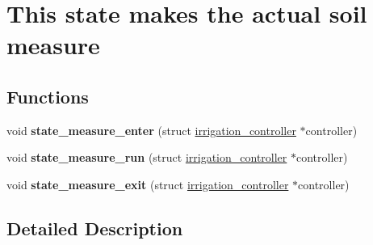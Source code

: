 \hypertarget{group__state__measure}{}\section{This state makes the actual soil measure}
\label{group__state__measure}
\subsection*{Functions}
\begin{DoxyCompactItemize}
\item 
\hypertarget{group__state__measure_ga24a42892ba25be220bff68fc151e0be7}{}void {\bfseries state\+\_\+measure\+\_\+enter} (struct \hyperlink{structirrigation__controller}{irrigation\+\_\+controller} $\ast$controller)\label{group__state__measure_ga24a42892ba25be220bff68fc151e0be7}

\item 
\hypertarget{group__state__measure_ga410776694bde81bde92a0b6b178ac015}{}void {\bfseries state\+\_\+measure\+\_\+run} (struct \hyperlink{structirrigation__controller}{irrigation\+\_\+controller} $\ast$controller)\label{group__state__measure_ga410776694bde81bde92a0b6b178ac015}

\item 
\hypertarget{group__state__measure_ga0f85f8645f5311e776e85a3697517266}{}void {\bfseries state\+\_\+measure\+\_\+exit} (struct \hyperlink{structirrigation__controller}{irrigation\+\_\+controller} $\ast$controller)\label{group__state__measure_ga0f85f8645f5311e776e85a3697517266}

\end{DoxyCompactItemize}


\subsection{Detailed Description}
